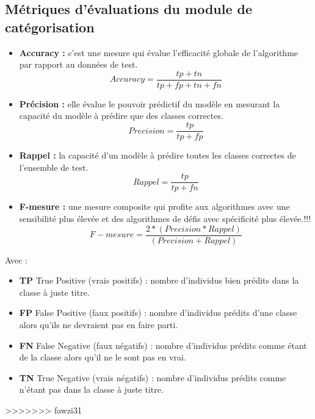     \subsection{Métriques d'évaluations du module de catégorisation}
    \begin{itemize}
        \item{\textbf{Accuracy :} }c'est une mesure qui évalue l'efficacité globale de l'algorithme par rapport au données de test.
        \[ Accuracy = \frac{tp+tn} {tp+fp+tn+fn} \]
        \item{\textbf{Précision :} }elle évalue le pouvoir prédictif du modèle en mesurant la capacité du modèle à prédire que des classes correctes.
        \[ Precision = \frac{tp} {tp+fp} \]
        \item{\textbf{Rappel :} }la capacité d’un modèle à prédire toutes les classes correctes de l'ensemble de test.
        \[ Rappel = \frac{tp} {tp+fn} \]
        \item{\textbf{F-mesure :} }une mesure composite qui profite aux algorithmes avec une sensibilité plus élevée et des algorithmes de défis avec spécificité plus élevée.!!!
        \[ F-mesure = \frac{2 * (Precision * Rappel)} {(Precision + Rappel)} \]
    \end{itemize}
    Avec :
    \begin{itemize}
        \item{\textbf{TP }True Positive (vrais positifs) :} nombre d'individus bien prédits dans la classe à juste titre.
        \item{\textbf{FP }False Positive (faux positifs) :} nombre d'individus prédits d'une classe alors qu'ils ne devraient pas en faire parti.
        \item{\textbf{FN }False Negative (faux négatifs) :} nombre d'individus prédits comme étant de la classe alors qu'il ne le sont pas en vrai.
        \item{\textbf{TN }True Negative (vrais négatifs) :} nombre d'individus prédits comme n'étant pas dans la classe à juste titre.
    \end{itemize}
>>>>>>> fawzi31

